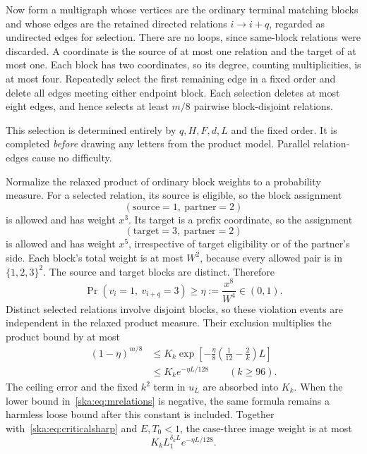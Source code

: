 \documentclass[11pt,letterpaper]{article}
\theoremstyle{definition}
\begin{document}
Now form a multigraph whose vertices are the ordinary terminal matching blocks and whose edges are the retained directed relations $i\to i+q$, regarded as undirected edges for selection. There are no loops, since same-block relations were discarded. A coordinate is the source of at most one relation and the target of at most one. Each block has two coordinates, so its degree, counting multiplicities, is at most four. Repeatedly select the first remaining edge in a fixed order and delete all edges meeting either endpoint block. Each selection deletes at most eight edges, and hence selects at least $m/8$ pairwise block-disjoint relations.

This selection is determined entirely by $q,H,F,d,L$ and the fixed order. It is completed \emph{before} drawing any letters from the product model. Parallel relation-edges cause no difficulty.

Normalize the relaxed product of ordinary block weights to a probability measure. For a selected relation, its source is eligible, so the block assignment
\[
(\text{source}=1,\ \text{partner}=2)
\]
is allowed and has weight $x^3$. Its target is a prefix coordinate, so the assignment
\[
(\text{target}=3,\ \text{partner}=2)
\]
is allowed and has weight $x^5$, irrespective of target eligibility or of the partner's side. Each block's total weight is at most $W^2$, because every allowed pair is in $\{1,2,3\}^2$. The source and target blocks are distinct. Therefore
\begin{equation}\label{ska:eq:eta}
\Pr(v_i=1,\ v_{i+q}=3)\ge\eta:=\frac{x^8}{W^4}\in(0,1).
\end{equation}
Distinct selected relations involve disjoint blocks, so these violation events are independent in the relaxed product measure. Their exclusion multiplies the product bound by at most
\begin{align}
(1-\eta)^{m/8}
&\le K_k\exp\left[-\frac\eta8\left(\frac1{12}-\frac2k\right)L\right]\label{ska:eq:penalty}\\
&\le K_k e^{-\eta L/128}\qquad(k\ge96).\nonumber
\end{align}
The ceiling error and the fixed $k^2$ term in $u_L$ are absorbed into $K_k$. When the lower bound in~\eqref{ska:eq:mrelations} is negative, the same formula remains a harmless loose bound after this constant is included. Together with~\eqref{ska:eq:criticalsharp} and $E,T_0<1$, the case-three image weight is at most
\begin{equation}\label{ska:eq:casethree}
K_kL_1^{\delta_kL}e^{-\eta L/128}.
\end{equation}
\end{document}
